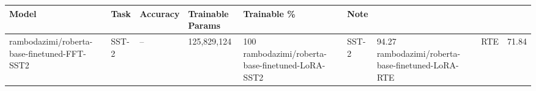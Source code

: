 \begin{tabular}{llllll}
\toprule
Model & Task & Accuracy & Trainable Params & Trainable \% & Note \\
\midrule
rambodazimi/roberta-base-finetuned-FFT-SST2 & SST-2 & -- & 125,829,124 & 100%
rambodazimi/roberta-base-finetuned-LoRA-SST2 & SST-2 & 94.27%
rambodazimi/roberta-base-finetuned-LoRA-RTE & RTE & 71.84%
\bottomrule
\end{tabular}

